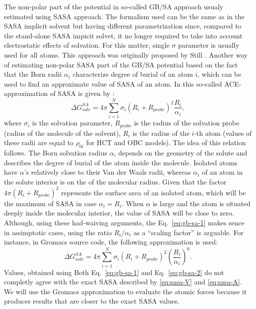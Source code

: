 \documentclass[11pt]{book}
\begin{document}
The non-polar part of the potential in so-called GB/SA approach usualy estimated using SASA approach. The formalism used can be the same as in the SASA implicit solvent but having different parametrization since, compared to the stand-alone SASA impicit solvet, it no longer required to take into account electrostatic effects of solvation. For this matter, single $\sigma$ parameter is usually used for all atoms. This approach was originally proposed by Still \cite{StillJACS90,QiuJPC97,HaselTCM88}. Another way of estimating non-polar SASA part of the GB/SA potential based on the fact that the Born radii $\alpha_{i}$ characterize degree of burial of an atom $i$, which can be used to find an approximate value of SASA of an atom. In this so-called ACE-approximation of SASA is given by \cite{SchaeferJMB98}:
\begin{equation}\label{eq:gb-sa-1}
\Delta G^{SA}_{solv}=4\pi\sum_{i=1}^{N}\sigma_{i}\left(R_{i}+R_{probe}\right)^{2}\frac{R_{i}}{\alpha_{i}},
\end{equation}
where $\sigma_{i}$ is the solvation parameter, $R_{probe}$ is the radius of the solvation probe (radius of the molecule of the solvent), $R_{i}$ is the radius of the $i$-th atom (values of these radii are equal to $\rho_{0i}$ for HCT and OBC models). The idea of this relation follows. The Born solvation radius $\alpha_{i}$ depends on the geometry of the solute and describes the degree of burial of the atom inside the molecule. Isolated atoms have $\alpha$'s relatively close to their Van der Waals radii, whereas $\alpha_{i}$ of an atom in the solute interior is on the of the molecular radius. Given that the factor $4\pi\left(R_{i}+R_{probe}\right)^{2}$ represents the surface area of an isolated atom, which will be the maximum of SASA in case $\alpha_{i}=R_{i}$. When $\alpha$ is large and the atom is situated deeply inside the molecular interior, the value of SASA will be close to zero. Although, using these had-waiving arguments, the Eq.~\ref{eq:gb-sa-1} makes sence in assimptotic cases, using the ratio $R_{i}/\alpha_{i}$ as a ``scaling factor'' is arguable. For instance, in Gromacs source code, the following approximation is used:
\begin{equation}\label{eq:gb-sa-2}
\Delta G^{SA}_{solv}=4\pi\sum_{i=1}^{N}\sigma_{i}\left(R_{i}+R_{probe}\right)^{2}\left(\frac{R_{i}}{\alpha_{i}}\right)^{6}.
\end{equation}
Values, obtained using Both Eq.~\ref{eq:gb-sa-1} and Eq.~\ref{eq:gb-sa-2} do not completly agree with the exact SASA described by \ref{eq:sasa-V} and \ref{eq:sasa-A}. We will use the Gromacs approximation to evaluate the atomic forces because it produces results that are closer to the exact SASA values.
\end{document}
